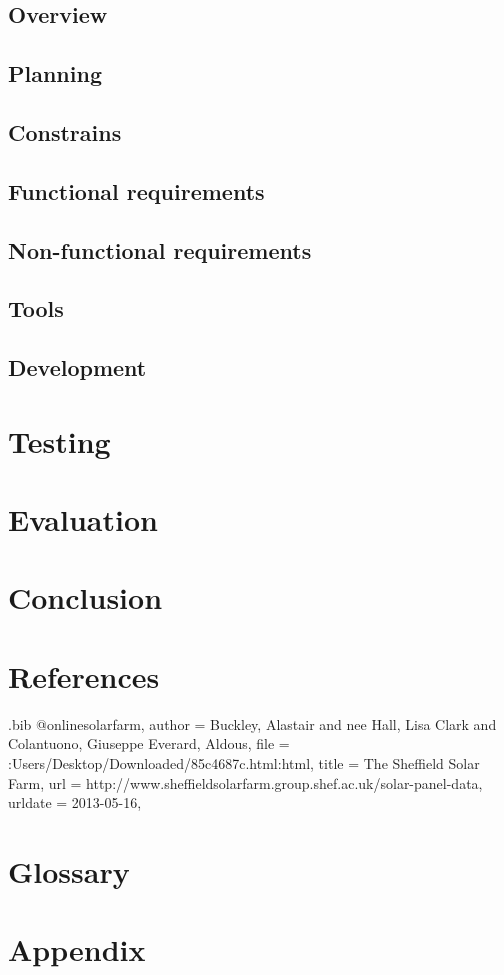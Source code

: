 \documentclass{article}
\begin{document}
  \subsection{Overview}
  \subsection{Planning}
  \subsection{Constrains}
  \subsection{Functional requirements}
  \subsection{Non-functional requirements}
  \subsection{Tools}
  \subsection{Development}

  \newpage
  \section{Testing}

  \newpage
  \section{Evaluation}

  \newpage
  \section{Conclusion}

  \newpage
  \section{References}



\begin{filecontents}{\jobname.bib}
	@online{solarfarm, 
		author  = {Buckley, Alastair and nee Hall, Lisa Clark and {Colantuono, Giuseppe Everard}, Aldous}, 
		file    = {:Users/Desktop/Downloaded/85c4687c.html:html}, 
		title   = {{The Sheffield Solar Farm}}, 
		url     = {http://www.sheffieldsolarfarm.group.shef.ac.uk/solar-panel-data}, 
		urldate = {2013-05-16}, 
	}
\end{filecontents}



  \section{Glossary}

  \newpage
  \section{Appendix}
\end{document}
